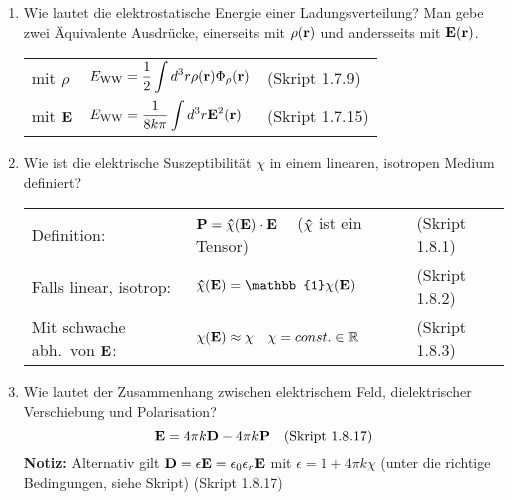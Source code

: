 \documentclass{scrartcl}
\newcommand{\ds}{\displaystyle}
\begin{document}
\begin{enumerate}
    \item Wie lautet die elektrostatische Energie einer Ladungsverteilung?
          Man gebe zwei Äquivalente Ausdrücke, einerseits mit $\rho(\vb r)$
          und andersseits mit $\vb E(\vb r)$.
          \begin{center}
          \begin{tabular}{lll}
            mit $\rho$    & $\ds E_{\text{WW}}=
                            \frac{1}{2}\int d^3 r\rho(\vb r)
                            \Phi_\rho(\vb r)$
                              &(Skript 1.7.9)\\
            mit $\vb E$   & $\ds E_{\text{WW}}=\frac{1}{8k\pi}
                             \int d^3 r\vb E^2(\vb r)$
                              &(Skript 1.7.15)\\
          \end{tabular}
          \end{center}

    \clearpage
    \item Wie ist die elektrische Suszeptibilität $\chi$ in einem 
          linearen, isotropen Medium definiert?
          \begin{center}
          \begin{tabular}{lll}
            Definition:             & $\ds\vb P = 
                                      \vu \chi(\vb E)\cdot \vb E\quad$
                                      ($\vu\chi$ ist ein Tensor)
                                      & (Skript 1.8.1) \\
            Falls linear, isotrop: 
                                    & $\ds\vu\chi(\vb E)=
                                         \mathbb{1}\chi(\vb E)$
                                      & (Skript 1.8.2) \\
            Mit schwache abh.\ von $\vb E$:
                                    & $\chi(\vb E)\approx\chi
                                       \quad\chi=const.\in\mathbb{R}$
                                      & (Skript 1.8.3) \\
            
          \end{tabular}
          \end{center}

    \item Wie lautet der Zusammenhang zwischen elektrischem Feld, 
          dielektrischer Verschiebung und Polarisation?
          $$\vb E= 4\pi k\vb D - 4\pi k\vb P \quad\text{(Skript 1.8.17)}$$
          \textbf{Notiz:} Alternativ gilt $\vb D=\epsilon \vb E
          =\epsilon_0\epsilon_r \vb E$ mit
          $\epsilon=1+4\pi k\chi$ 
          (unter die richtige Bedingungen, siehe Skript) (Skript 1.8.17)\\


\end{enumerate}
\end{document}
